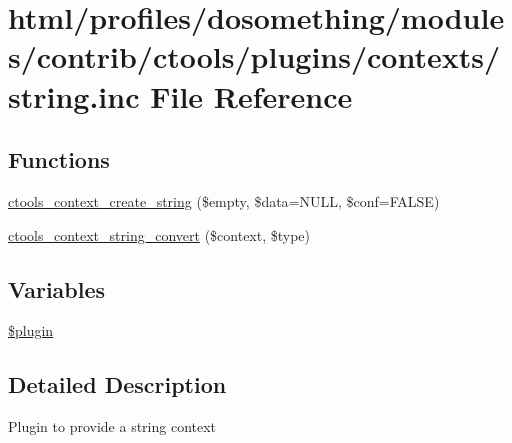 \hypertarget{contexts_2string_8inc}{
\section{html/profiles/dosomething/modules/contrib/ctools/plugins/contexts/string.inc File Reference}
\label{contexts_2string_8inc}
}
\subsection*{Functions}
\begin{DoxyCompactItemize}
\item 
\hyperlink{contexts_2string_8inc_ab651d513ca31a0ca745a12a096fa5db3}{ctools\_\-context\_\-create\_\-string} (\$empty, \$data=NULL, \$conf=FALSE)
\item 
\hyperlink{contexts_2string_8inc_a075694e2e95ab80f542b8e119617c8de}{ctools\_\-context\_\-string\_\-convert} (\$context, \$type)
\end{DoxyCompactItemize}
\subsection*{Variables}
\begin{DoxyCompactItemize}
\item 
\hyperlink{contexts_2string_8inc_ada8a7130088351710bb02ed622d6bf65}{\$plugin}
\end{DoxyCompactItemize}


\subsection{Detailed Description}
Plugin to provide a string context 

